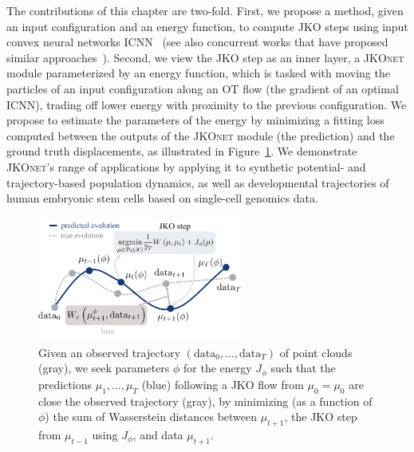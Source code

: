 The contributions of this chapter are two-fold. First, we propose a method, given an input configuration and an energy function, to compute \acrshort{JKO} steps using input convex neural networks \acrlong{ICNN}~\citep{amos2017input,makkuva2020optimal} (see also concurrent works that have proposed similar approaches~\citep{alvarez2021optimizing, mokrov2021large}). Second, we view the \acrshort{JKO} step as an inner layer, a \textsc{JKOnet} module parameterized by an energy function, which is tasked with moving the particles of an input configuration along an OT flow (the gradient of an optimal ICNN), trading off lower energy with proximity to the previous configuration.
We propose to estimate the parameters of the energy by minimizing a fitting loss %
computed between the outputs of the \textsc{JKOnet} module (the prediction) and the ground truth displacements, as illustrated in Figure~\ref{fig:overview_jkonet}.
We demonstrate \textsc{JKOnet}'s range of applications by applying it to synthetic potential- and trajectory-based population dynamics, as well as developmental trajectories of human embryonic stem cells based on single-cell genomics data.

\begin{figure}[t]
    \centering
    \includegraphics[width=0.6\textwidth]{figures/fig_overview_jkonet.pdf}
    \caption{Given an observed trajectory $(\mathrm{data}_0,\dots,\mathrm{data}_T)$ of point clouds (gray), we seek parameters $\phi$ for the energy $J_\phi$ such that the predictions $\mu_1, \dots, \mu_T$ (blue) following a \acrshort{JKO} flow from $\mu_0=\mu_0$ are close the observed trajectory (gray), by minimizing (as a function of $\phi$) the sum of Wasserstein distances between $\mu_{t+1}$, the \acrshort{JKO} step from $\mu_{t-1}$ using $J_\phi$, and data $\mu_{t+1}$.}
    \label{fig:overview_jkonet}
\end{figure}


